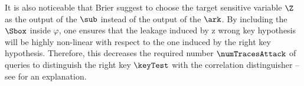 It is also noticeable that Brier \etal{} suggest to choose the target sensitive variable \(\Z\) as the output of the \(\sub\) instead of the output of the \(\ark\).
By including the \(\Sbox\) inside \(\varphi\), one ensures that the leakage induced by z wrong key hypothesis will be highly non-linear with respect to the one induced by the right key hypothesis. 
Therefore, this decreases the required number \(\numTracesAttack\) of queries to distinguish the right key \(\keyTest\) with the correlation distinguisher -- see \cite[Sec.~6.3.1]{mangard_power_2007} for an explanation.